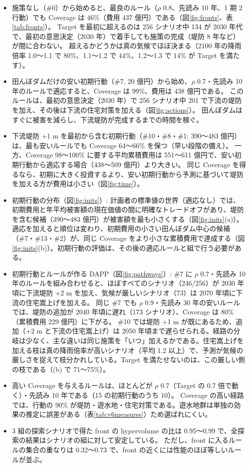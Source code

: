 \documentclass[a4paper,10pt]{ltjsarticle}
\begin{document}
\begin{itemize}
  \item 施策なし（\#0）から始めると、最良のルール（$\rho$ 0.8、先読み 10 年、1 期 2 行動）でも Coverage は 46\%（費用 437 億円）である（図\ref{fig:fronts}、表\ref{tab:fronts}）。
    Target を最初に超えるのは 256 シナリオ中 134 が 2030 年代で、最初の意思決定（2030 年）で着手しても施策の完成（堤防 8 年など）が間に合わない。
    超えるかどうかは真の気候でほぼ決まる（2100 年の降雨倍率 1.0〜1.1 で 80\%、1.1〜1.2 で 44\%、1.2〜1.3 で 14\% が Target を満たす）。
  \item 田んぼダムだけの安い初期行動（\#7, 20 億円）から始め、$\rho$ 0.7・先読み 10 年のルールで適応すると、Coverage は 99\%、費用は 438 億円である。
    このルールは、最初の意思決定（2030 年）で 256 シナリオ中 201 で下流の堤防を加え、その後は下流の住宅対策を加える（図\ref{fig:actions}）。
    田んぼダムはすぐに被害を減らし、下流堤防が完成するまでの時間を稼ぐ。
  \item 下流堤防 +1 m を最初から含む初期行動（\#10・\#8・\#1; 390〜483 億円）は、最も安いルールでも Coverage 64〜66\% を保つ（早い段階の備え）。
    一方、Coverage 98〜100\% に要する平均累積費用は 551〜611 億円で、安い初期行動から適応する場合（438〜509 億円）より大きい。
    同じ Coverage を得るなら、初期に大きく投資するより、安い初期行動から予測に基づいて堤防を加える方が費用は小さい（図\ref{fig:time}）。
  \item 初期行動の分布（図\ref{fig:inits}）: 計画者の標準値の世界（適応なし）では、初期費用と年平均被害額の現在価値の間に明確なトレードオフがあり、堤防を含む候補（390〜483 億円）が被害額を最も小さくする（図\ref{fig:inits}(a)）。
    適応を加えると順位は変わり、初期費用の小さい田んぼダム中心の候補（\#7・\#13・\#2）が、同じ Coverage をより小さな累積費用で達成する（図\ref{fig:inits}(b)）。初期行動の評価は、その後の適応ルールと組で行う必要がある。
  \item 初期行動とルールが作る DAPP（図\ref{fig:pathways}）: \#7 に $\rho$ 0.7・先読み 10 年のルールを組み合わせると、ほぼすべてのシナリオ（246/256）が 2030 年頃に下流堤防 +2 m を加え、気候が厳しいシナリオ（73）は 2070 年頃に下流の住宅嵩上げを加える。
    同じ \#7 でも $\rho$ 0.9・先読み 30 年の安いルールでは、堤防の追加が 2040 年頃に遅れ（173 シナリオ）、Coverage は 80\%（累積費用 229 億円）に下がる。
    \#10 では堤防 +1 m が既にあるため、追加（+2 m と下流の住宅嵩上げ）は 2050 年頃まで遅らせられる。経路の分岐は少なく、主な違いは同じ施策を「いつ」加えるかである。住宅嵩上げを加える枝は真の降雨倍率が高いシナリオ（平均 1.2 以上）で、予測が気候の厳しさを捉えて枝分かれしている。Target を満たせないのは、この厳しい側の枝である（(b) で 71〜75\%）。
  \item 高い Coverage を与えるルールは、ほとんどが $\rho$ 0.7（Target の 0.7 倍で動く）・先読み 10 年である（15 の初期行動のうち 10）。
    Coverage の高い経路では、行動の 90\% が堤防・遊水地・住宅対策である。遊水地群は単独の効果の推定に誤差がある（表\ref{tab:v6measures}）ため選ばれにくい。
  \item 3 組の探索シナリオで得た front の hypervolume の比は 0.95〜0.99 で、全探索の結果はシナリオの組に対して安定している。
    ただし、front に入るルールの集合の重なりは 0.32〜0.73 で、front の近くには性能のほぼ等しいルールが並ぶ。
\end{itemize}
\end{document}

